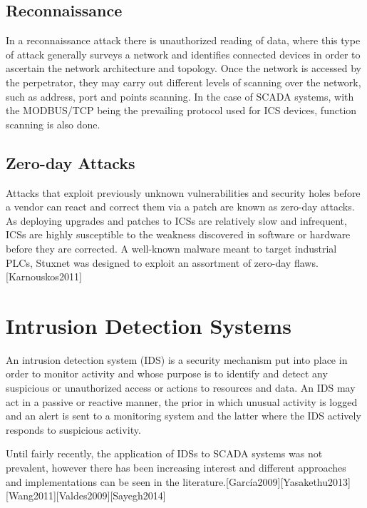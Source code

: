 \documentclass[12pt,]{article}
\begin{document}
\subsection{Reconnaissance}\label{reconnaissance}

In a reconnaissance attack there is unauthorized reading of data, where
this type of attack generally surveys a network and identifies connected
devices in order to ascertain the network architecture and topology.
Once the network is accessed by the perpetrator, they may carry out
different levels of scanning over the network, such as address, port and
points scanning. In the case of SCADA systems, with the MODBUS/TCP being
the prevailing protocol used for ICS devices, function scanning is also
done.

\subsection{Zero-day Attacks}\label{zero-day-attacks}

Attacks that exploit previously unknown vulnerabilities and security
holes before a vendor can react and correct them via a patch are known
as zero-day attacks. As deploying upgrades and patches to ICSs are
relatively slow and infrequent, ICSs are highly susceptible to the
weakness discovered in software or hardware before they are corrected. A
well-known malware meant to target industrial PLCs, Stuxnet was designed
to exploit an assortment of zero-day flaws.{[}Karnouskos2011{]}

\pagebreak

\section{Intrusion Detection Systems}\label{intrusion-detection-systems}

An intrusion detection system (IDS) is a security mechanism put into
place in order to monitor activity and whose purpose is to identify and
detect any suspicious or unauthorized access or actions to resources and
data. An IDS may act in a passive or reactive manner, the prior in which
unusual activity is logged and an alert is sent to a monitoring system
and the latter where the IDS actively responds to suspicious activity.

Until fairly recently, the application of IDSs to SCADA systems was not
prevalent, however there has been increasing interest and different
approaches and implementations can be seen in the
literature.{[}García2009{]}{[}Yasakethu2013{]}
{[}Wang2011{]}{[}Valdes2009{]}{[}Sayegh2014{]}
\end{document}
